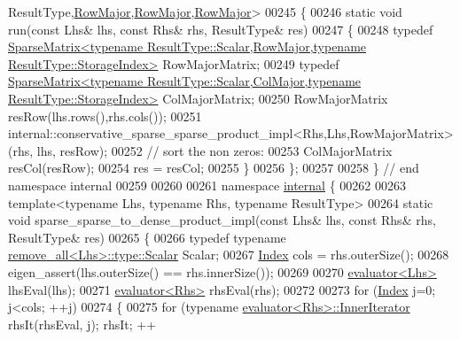 \begin{DoxyCode}
      ResultType,\hyperlink{group__enums_ggaacded1a18ae58b0f554751f6cdf9eb13acfcde9cd8677c5f7caf6bd603666aae3}{RowMajor},\hyperlink{group__enums_ggaacded1a18ae58b0f554751f6cdf9eb13acfcde9cd8677c5f7caf6bd603666aae3}{RowMajor},\hyperlink{group__enums_ggaacded1a18ae58b0f554751f6cdf9eb13acfcde9cd8677c5f7caf6bd603666aae3}{RowMajor}>
00245 \{
00246   \textcolor{keyword}{static} \textcolor{keywordtype}{void} run(\textcolor{keyword}{const} Lhs& lhs, \textcolor{keyword}{const} Rhs& rhs, ResultType& res)
00247   \{
00248     \textcolor{keyword}{typedef} 
      \hyperlink{group___sparse_core___module_class_eigen_1_1_sparse_matrix}{SparseMatrix<typename ResultType::Scalar,RowMajor,typename ResultType::StorageIndex>}
       RowMajorMatrix;
00249     \textcolor{keyword}{typedef} 
      \hyperlink{group___sparse_core___module_class_eigen_1_1_sparse_matrix}{SparseMatrix<typename ResultType::Scalar,ColMajor,typename ResultType::StorageIndex>}
       ColMajorMatrix;
00250     RowMajorMatrix resRow(lhs.rows(),rhs.cols());
00251     internal::conservative\_sparse\_sparse\_product\_impl<Rhs,Lhs,RowMajorMatrix>(rhs, lhs, resRow);
00252     \textcolor{comment}{// sort the non zeros:}
00253     ColMajorMatrix resCol(resRow);
00254     res = resCol;
00255   \}
00256 \};
00257 
00258 \} \textcolor{comment}{// end namespace internal}
00259 
00260 
00261 \textcolor{keyword}{namespace }\hyperlink{namespaceinternal}{internal} \{
00262 
00263 \textcolor{keyword}{template}<\textcolor{keyword}{typename} Lhs, \textcolor{keyword}{typename} Rhs, \textcolor{keyword}{typename} ResultType>
00264 \textcolor{keyword}{static} \textcolor{keywordtype}{void} sparse\_sparse\_to\_dense\_product\_impl(\textcolor{keyword}{const} Lhs& lhs, \textcolor{keyword}{const} Rhs& rhs, ResultType& res)
00265 \{
00266   \textcolor{keyword}{typedef} \textcolor{keyword}{typename} \hyperlink{struct_eigen_1_1internal_1_1remove__all}{remove\_all<Lhs>::type::Scalar} Scalar;
00267   \hyperlink{namespace_eigen_a62e77e0933482dafde8fe197d9a2cfde}{Index} cols = rhs.outerSize();
00268   eigen\_assert(lhs.outerSize() == rhs.innerSize());
00269 
00270   \hyperlink{struct_eigen_1_1internal_1_1evaluator}{evaluator<Lhs>} lhsEval(lhs);
00271   \hyperlink{struct_eigen_1_1internal_1_1evaluator}{evaluator<Rhs>} rhsEval(rhs);
00272 
00273   \textcolor{keywordflow}{for} (\hyperlink{namespace_eigen_a62e77e0933482dafde8fe197d9a2cfde}{Index} j=0; j<cols; ++j)
00274   \{
00275     \textcolor{keywordflow}{for} (\textcolor{keyword}{typename} \hyperlink{struct_eigen_1_1internal_1_1evaluator}{evaluator<Rhs>::InnerIterator} rhsIt(rhsEval, j); rhsIt; ++

\end{DoxyCode}

